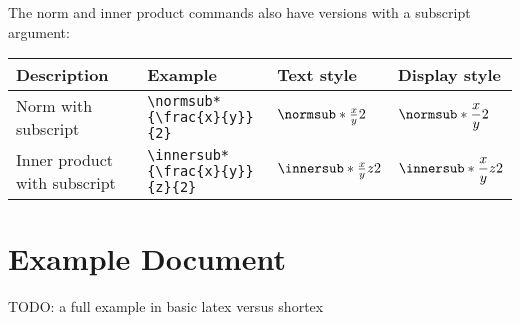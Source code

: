 \documentclass{article}
\begin{document}
The norm and inner product commands also have versions with a subscript argument:

\begin{center}
\begin{tabular}{@{}llll@{}}
\toprule
Description				& Example 					& Text style 				& Display style \\ \midrule
Norm	with subscript				& \verb!\normsub*{\frac{x}{y}}{2}!       	& $\normsub*{\frac{x}{y}}{2}$ 	& $\displaystyle\normsub*{\frac{x}{y}}{2}$ \\[10pt]
Inner product with subscript			& \verb!\innersub*{\frac{x}{y}}{z}{2}!       	& $\innersub*{\frac{x}{y}}{z}{2}$ 	& $\displaystyle\innersub*{\frac{x}{y}}{z}{2}$ \\[10pt]
\bottomrule
\end{tabular}
\end{center}



\section{Example Document}

TODO: a full example in basic latex versus shortex
\end{document}
